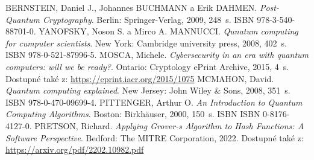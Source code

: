 \begin{thebibliography}{99}
  BERNSTEIN, Daniel J., Johannes BUCHMANN a Erik DAHMEN. \textit{Post-Quantum Cryptography}. Berlin: Springer-Verlag, 2009, 248~s. ISBN 978-3-540-88701-0.
  YANOFSKY, Noson S. a Mirco A. MANNUCCI. \textit{Qunatum computing for cumputer scientists}. New York: Cambridge university press, 2008, 402~s. ISBN 978-0-521-87996-5.
  MOSCA, Michele. \textit{Cybersecurity in an era with quantum computers: will we be ready?}. Ontario: Cryptology ePrint Archive, 2015, 4~s. Dostupné také z: \url{https://eprint.iacr.org/2015/1075} %
  MCMAHON, David. \textit{Quantum computing explained}. New Jersey: John Wiley \& Sons, 2008, 351~s. ISBN 978-0-470-09699-4. 
  PITTENGER, Arthur O. \textit{An Introduction to Quantum Computing Algorithms}. Boston: Birkhäuser, 2000, 150~s. ISBN ISBN 0-8176-4127-0.
  PRETSON, Richard. \textit{Applying Grover-s Algorithm to Hash Functions: A Software Perspective}. Bedford: The MITRE Corporation, 2022. Dostupné také z: \url{https://arxiv.org/pdf/2202.10982.pdf}
\end{thebibliography}

% 
% 
%
